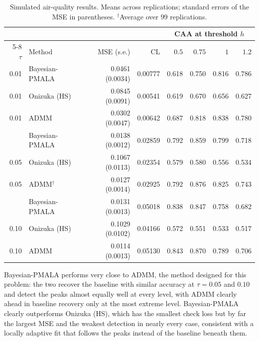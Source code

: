 \begin{table}[H]
\centering
\small
\setlength{\tabcolsep}{4pt}
\caption{Simulated air-quality results. Means across replications; standard errors of the MSE in parentheses. $^{\dagger}$Average over $99$ replications.}
\label{tab:air_n500}
\begin{tabular}{@{}rlrrrrrr@{}}
\toprule
 & & & & \multicolumn{4}{c}{CAA at threshold $h$} \\
\cmidrule(lr){5-8}
$\tau$ & Method & MSE (s.e.) & CL & $0.5$ & $0.75$ & $1$ & $1.2$ \\
\midrule
0.01 & Bayesian-PMALA & 0.0461 (0.0034) & 0.00777 & 0.618 & 0.750 & 0.816 & 0.786 \\
0.01 & Onizuka (HS) & 0.0845 (0.0091) & 0.00541 & 0.619 & 0.670 & 0.656 & 0.627 \\
0.01 & ADMM & 0.0302 (0.0047) & 0.00642 & 0.687 & 0.818 & 0.838 & 0.780 \\
\addlinespace[3pt]
0.05 & Bayesian-PMALA & 0.0138 (0.0012) & 0.02859 & 0.792 & 0.859 & 0.799 & 0.718 \\
0.05 & Onizuka (HS) & 0.1067 (0.0113) & 0.02354 & 0.579 & 0.580 & 0.556 & 0.534 \\
0.05 & ADMM$^{\dagger}$ & 0.0127 (0.0014) & 0.02925 & 0.792 & 0.876 & 0.825 & 0.743 \\
\addlinespace[3pt]
0.10 & Bayesian-PMALA & 0.0131 (0.0013) & 0.05018 & 0.838 & 0.847 & 0.758 & 0.682 \\
0.10 & Onizuka (HS) & 0.1029 (0.0102) & 0.04166 & 0.572 & 0.551 & 0.533 & 0.517 \\
0.10 & ADMM & 0.0114 (0.0013) & 0.05130 & 0.843 & 0.870 & 0.789 & 0.706 \\
\bottomrule
\end{tabular}
\end{table}

Bayesian-PMALA performs very close to ADMM, the method designed for this problem: the two recover the baseline with similar accuracy at $\tau=0.05$ and $0.10$ and detect the peaks almost equally well at every level, with ADMM clearly ahead in baseline recovery only at the most extreme level. Bayesian-PMALA clearly outperforms Onizuka (HS), which has the smallest check loss but by far the largest MSE and the weakest detection in nearly every case, consistent with a locally adaptive fit that follows the peaks instead of the baseline beneath them.
